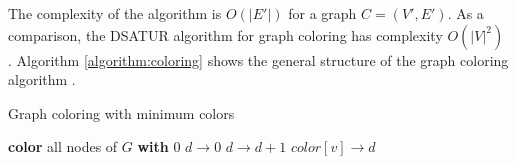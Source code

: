 The complexity of the algorithm is $O(|E'|)$ for a graph $C = (V',E')$.
As a comparison, the DSATUR algorithm for graph coloring has complexity $O(|V|^2)$ \citep{brelaz1979new}.
Algorithm \autoref{algorithm:coloring} shows the general structure of the graph coloring algorithm  \citep{mittal2011graph}.

\begin{algorithm}
\caption{Graph coloring with minimum colors}\label{algorithm:coloring}
\begin{algorithmic}[1]


\State \textbf{color} all nodes of $G$ \textbf{with} 0
\State $d \rightarrow 0$
			\State $d \rightarrow d+1$
		\EndIf
		\State $color[v] \rightarrow d$
	\EndIf
\EndFor


\EndFunction
\end{algorithmic}
\end{algorithm}


